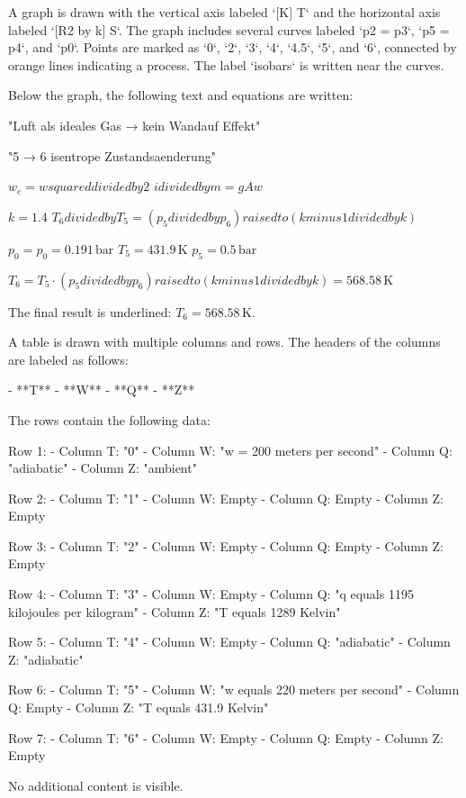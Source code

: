 A graph is drawn with the vertical axis labeled `[K] T` and the horizontal axis labeled `[R2 by k] S`. The graph includes several curves labeled `p2 = p3`, `p5 = p4`, and `p0`. Points are marked as `0`, `2`, `3`, `4`, `4.5`, `5`, and `6`, connected by orange lines indicating a process. The label `isobars` is written near the curves.  

Below the graph, the following text and equations are written:  

"Luft als ideales Gas → kein Wandauf Effekt"  

"5 → 6 isentrope Zustandsaenderung"  

\( w_e = w squared divided by 2 \)  
\( i divided by m = g A w \)  

\( k = 1.4 \)  
\( T_6 divided by T_5 = (p_5 divided by p_6) raised to (k minus 1 divided by k) \)  

\( p_0 = p_0 = 0.191 \, \text{bar} \)  
\( T_5 = 431.9 \, \text{K} \)  
\( p_5 = 0.5 \, \text{bar} \)  

\( T_6 = T_5 \cdot (p_5 divided by p_6) raised to (k minus 1 divided by k) = 568.58 \, \text{K} \)  

The final result is underlined: \( T_6 = 568.58 \, \text{K} \).

A table is drawn with multiple columns and rows. The headers of the columns are labeled as follows:  

- **T**  
- **W**  
- **Q**  
- **Z**  

The rows contain the following data:  

Row 1:  
- Column T: "0"  
- Column W: "w = 200 meters per second"  
- Column Q: "adiabatic"  
- Column Z: "ambient"  

Row 2:  
- Column T: "1"  
- Column W: Empty  
- Column Q: Empty  
- Column Z: Empty  

Row 3:  
- Column T: "2"  
- Column W: Empty  
- Column Q: Empty  
- Column Z: Empty  

Row 4:  
- Column T: "3"  
- Column W: Empty  
- Column Q: "q equals 1195 kilojoules per kilogram"  
- Column Z: "T equals 1289 Kelvin"  

Row 5:  
- Column T: "4"  
- Column W: Empty  
- Column Q: "adiabatic"  
- Column Z: "adiabatic"  

Row 6:  
- Column T: "5"  
- Column W: "w equals 220 meters per second"  
- Column Q: Empty  
- Column Z: "T equals 431.9 Kelvin"  

Row 7:  
- Column T: "6"  
- Column W: Empty  
- Column Q: Empty  
- Column Z: Empty  

No additional content is visible.